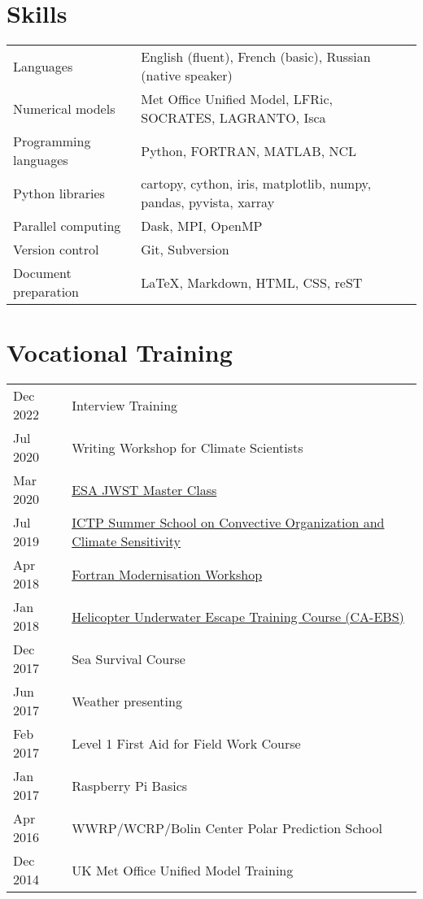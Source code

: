\documentclass[a4paper, 11pt]{article}
\begin{document}
\section{Skills}
\begin{tabularx}{\linewidth}{@{}l X@{}}
Languages & English (fluent), French (basic), Russian (native speaker) \\
Numerical models &  Met Office Unified Model, LFRic, SOCRATES, LAGRANTO, Isca \\
Programming languages &  Python, FORTRAN, MATLAB, NCL \\
Python libraries & cartopy, cython, iris, matplotlib, numpy, pandas, pyvista, xarray \\
Parallel computing & Dask, MPI, OpenMP \\
Version control & Git, Subversion \\
Document preparation & \LaTeX, Markdown, HTML, CSS, reST
\end{tabularx}

\section{Vocational Training}
\begin{tabularx}{\linewidth}{@{}l X@{}}
Dec 2022 & Interview Training \\
Jul 2020 & Writing Workshop for Climate Scientists \\
Mar 2020 & \href{https://ers-imaging.github.io/uk_workshop}{ESA JWST Master Class} \\
Jul 2019 & \href{https://indico.ictp.it/event/8669}{ICTP Summer School on Convective Organization and Climate Sensitivity} \\
Apr 2018 & \href{https://www.nag.com/content/fortran-modernization-workshop}{Fortran Modernisation Workshop} \\
Jan 2018 & \href{http://www.petans.co.uk/courses/survival/huet-caebs/}{Helicopter Underwater Escape Training Course (CA-EBS)} \\
Dec 2017 & Sea Survival Course \\
Jun 2017 & Weather presenting \\
Feb 2017 & Level 1 First Aid for Field Work Course \\
Jan 2017 & Raspberry Pi Basics \\
Apr 2016 & WWRP/WCRP/Bolin Center Polar Prediction School \\
Dec 2014 & UK Met Office Unified Model Training \\
\end{tabularx}
\end{document}
